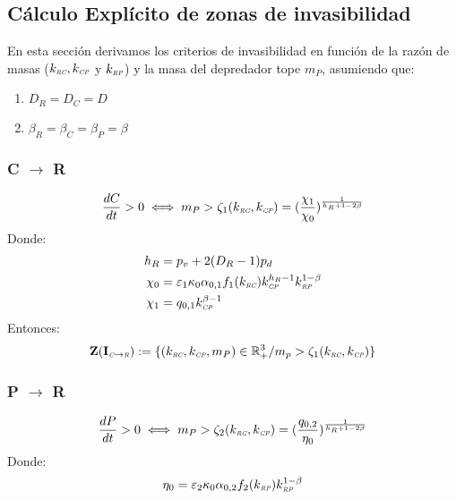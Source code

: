 \subsection{C\'alculo Expl\'icito de zonas de invasibilidad}

En esta secci\'on derivamos los criterios de invasibilidad en funci\'on de la raz\'on de masas ($k_{\textit{\tiny RC}},k_{\textit{\tiny CP}}$ y $k_{\textit{\tiny RP}}$) y la masa del depredador tope $m_P$, asumiendo que:
\begin{enumerate}
\item $D_R = D_C = D$
\item $\beta_R = \beta_C = \beta_P = \beta$
\end{enumerate}


\subsubsection{C $\to$ R}

\begin{equation}
  \frac{dC}{dt} >0 \iff  m_P > \zeta_1(k_{\textit{\tiny RC}},k_{\textit{\tiny CP}}) = (\frac{\chi_1}{\chi_0})^{\frac{1}{h_R +1 - 2\beta }}
\end{equation}
Donde:
\begin{equation}
  \begin{aligned}
    h_R &= p_v + 2(D_R - 1)p_d \\
    \chi_0 &= \varepsilon_1 \kappa_0\alpha_{0,1} f_1(k_{\textit{\tiny RC}})k_{\textit{\tiny CP}}^{h_R -1} k_{\textit{\tiny RP}}^{1-\beta} \\
    \chi_1 &= q_{0,1} k_{\textit{\tiny CP}}^{\beta-1} 
  \end{aligned}
\end{equation}
Entonces:
\begin{equation}
\mathbf{Z(I_{\textit{\tiny C}\to \textit{\tiny R}})} := \{ (k_{\textit{\tiny RC}},k_{\textit{\tiny CP}},m_P) \in \mathbb{R}^3_+ / m_p > \zeta_1(k_{\textit{\tiny RC}},k_{\textit{\tiny CP}}) \}
\end{equation}

\subsubsection{P $\to$ R}

\begin{equation}
  \frac{dP}{dt} >0 \iff  m_P > \zeta_2(k_{\textit{\tiny RC}},k_{\textit{\tiny CP}}) = (\frac{q_{0,2}}{\eta_0})^{\frac{1}{h_R +1 - 2\beta}}
\end{equation}
Donde:
\begin{equation}
  \begin{aligned}
    \eta_0 &= \varepsilon_2 \kappa_0\alpha_{0,2} f_2(k_{\textit{\tiny RP}})k_{\textit{\tiny RP}}^{1-\beta} \\
  \end{aligned}
\end{equation}


